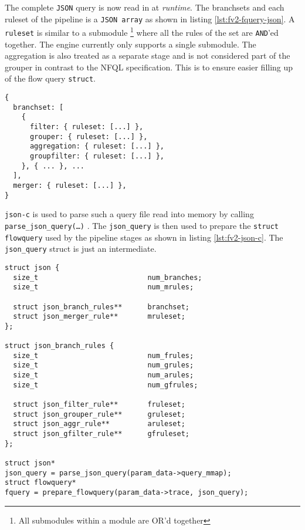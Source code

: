 The complete \texttt{JSON} query is now read in at \emph{runtime}. The
branchsets and each ruleset of the pipeline is a \texttt{JSON array} as shown
in listing \ref{lst:fv2-fquery-json}. A \texttt{ruleset} is similar to a
submodule \footnote{All submodules within a module are OR'd together} where
all the rules of the set are \texttt{AND}'ed together. The engine currently
only supports a single submodule. The aggregation is also treated as a
separate stage and is not considered part of the grouper in contrast to the
\ac{NFQL} specification. This is to ensure easier filling up of the flow query
\texttt{struct}.

\begin{lstlisting}
{
  branchset: [
    {
      filter: { ruleset: [...] },
      grouper: { ruleset: [...] },
      aggregation: { ruleset: [...] },
      groupfilter: { ruleset: [...] },
    }, { ... }, ...
  ],
  merger: { ruleset: [...] },
}
\end{lstlisting}

\texttt{json-c} is used to parse such a query file read into memory by calling
\texttt{parse\_json\_query(\ldots)} . The
\texttt{json\_query} is then used to prepare the \texttt{struct flowquery}
used by the pipeline stages as shown in listing \ref{lst:fv2-json-c}.  The
\texttt{json\_query} struct is just an intermediate.

\begin{lstlisting}
struct json {
  size_t                          num_branches;
  size_t                          num_mrules;

  struct json_branch_rules**      branchset;
  struct json_merger_rule**       mruleset;
};

struct json_branch_rules {
  size_t                          num_frules;
  size_t                          num_grules;
  size_t                          num_arules;
  size_t                          num_gfrules;

  struct json_filter_rule**       fruleset;
  struct json_grouper_rule**      gruleset;
  struct json_aggr_rule**         aruleset;
  struct json_gfilter_rule**      gfruleset;
};

struct json*
json_query = parse_json_query(param_data->query_mmap);
struct flowquery*
fquery = prepare_flowquery(param_data->trace, json_query);
\end{lstlisting}




